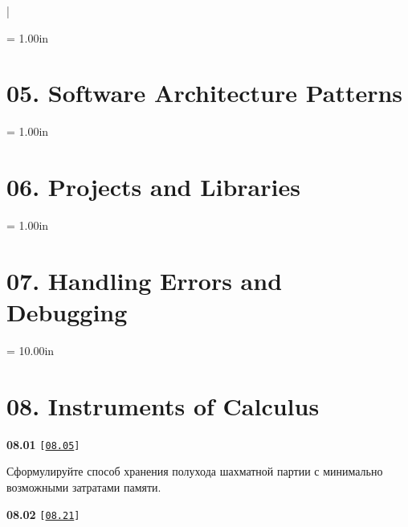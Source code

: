 \documentclass[a4paper,12pt]{article}
\begin{document}
\bigskip

|



\newpage\thispagestyle{empty}\pdfpageheight = 1.00in\enlargethispage{100in}

\section{05. Software Architecture Patterns}



\newpage\thispagestyle{empty}\pdfpageheight = 1.00in\enlargethispage{100in}

\section{06. Projects and Libraries}



\newpage\thispagestyle{empty}\pdfpageheight = 1.00in\enlargethispage{100in}

\section{07. Handling Errors and Debugging}



\newpage\thispagestyle{empty}\pdfpageheight = 10.00in\enlargethispage{100in}

\section{08. Instruments of Calculus}

{\large \textbf{08.01} \texttt{[\href{https://github.com/i-s-m-mipt/Education/blob/master/projects/examples/source/08.05.cpp}{\texttt{08.05}}]}}

\bigskip

Сформулируйте способ хранения полухода шахматной партии с минимально возможными затратами памяти.

\bigskip

{\large \textbf{08.02} \texttt{[\href{https://github.com/i-s-m-mipt/Education/blob/master/projects/examples/source/08.21.cpp}{\texttt{08.21}}]}}

\bigskip
\end{document}

